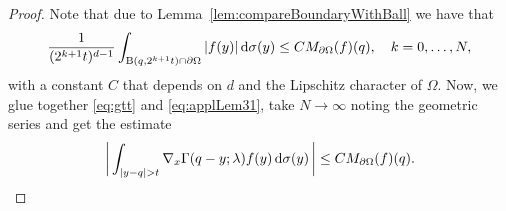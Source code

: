 \begin{proof}
  Note that due to Lemma~\ref{lem:compareBoundaryWithBall} we have that
  \begin{align}
    \label{eq:applLem31}
    \frac{1}{(2^{k+1} t)^{d - 1}} \int_{\mathrm{B}(q, 2^{k + 1}t) \cap \partial \Omega}  |f(y)| \, {\operatorname{d}\!{\sigma}}(y)
    \leq C M_{\partial\Omega}(f)(q), \quad k=0,\dots,N, 
  \end{align}
  with a constant $C$ that depends on $d$ and the Lipschitz character of $\Omega$.
  Now, we glue together \eqref{eq:gtt} and \eqref{eq:applLem31}, take $N \to \infty$ noting the geometric series and get the estimate
  \begin{align}
    \label{eq:finalgtt}
    \bigg| \int_{|y - q| > t} \nabla_x \Gamma(q - y; \lambda) f(y) \, {\operatorname{d}\!{\sigma}}(y) \,\bigg|
    \leq C M_{\partial\Omega}(f)(q).
  \end{align}


\end{proof}
